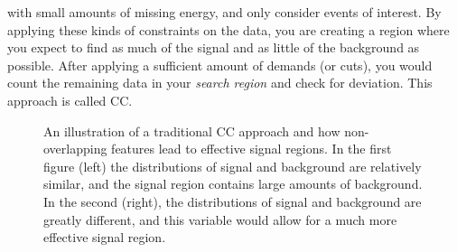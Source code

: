 with small amounts of missing energy, and only consider events of interest. By applying these kinds of 
constraints on the data, you are creating a region where you expect to find as much of the signal and as little 
of the background as possible. After applying a sufficient amount of demands (or cuts), you would count the 
remaining data in your \emph{search region} and check for deviation. This approach is called \acf{CC}.
\\
\begin{figure} 
    \centering
    \caption[An illustration of a traditional \acs{CC} approach and how non-overlapping features lead to effective
    signal regions.]{An illustration of a traditional \acf{CC} approach and how non-overlapping features lead to effective
    signal regions. In the first figure (left) the distributions of signal and background are relatively similar, and 
    the signal region contains large amounts of background. In the second (right), the distributions of signal and 
    background are greatly different, and this variable would allow for a much more effective signal region. }
    \label{fig:overlap}
\end{figure}

